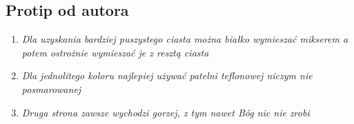 \documentclass[12pt, letterpaper, titlepage]{article}
\begin{document}
\subsection{Protip od autora}
\begin{enumerate}[*]
\item \textit{Dla uzyskania bardziej puszystego ciasta można białko wymieszać mikserem a potem ostrożnie wymieszać je z resztą ciasta}
\item \textit{Dla jednolitego koloru najlepiej używać patelni teflonowej niczym nie posmarowanej}
\item \textit{Druga strona zawsze wychodzi gorzej, z tym nawet Bóg nic nie zrobi }
\end{enumerate}
\end{document}
